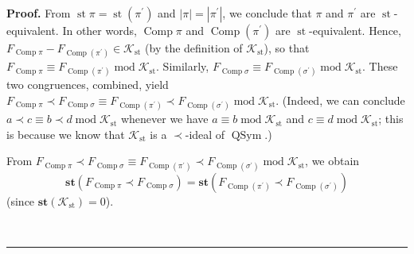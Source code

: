 \documentclass[numbers=enddot,12pt,final,onecolumn,notitlepage]{scrartcl}%
\theoremstyle{definition}
\newenvironment{proof}[1][Proof]{\noindent\textbf{#1.} }{\ \rule{0.5em}{0.5em}}
\newenvironment{verlong}{}{}
\begin{document}
\begin{verlong}
\begin{proof}
From $\operatorname{st} \pi   =\operatorname{st}\left(
\pi^{\prime}\right)  $ and $\left\vert \pi\right\vert =\left\vert \pi^{\prime
}\right\vert $, we conclude that $\pi$ and $\pi^{\prime}$ are
$\operatorname{st}$-equivalent. In other words, $\operatorname*{Comp}\pi$ and
$\operatorname*{Comp}\left(  \pi^{\prime}\right)  $ are $\operatorname{st}%
$-equivalent. Hence, $F_{\operatorname*{Comp}\pi}-F_{\operatorname*{Comp}%
\left(  \pi^{\prime}\right)  }\in\mathcal{K}_{\operatorname{st}}$ (by the
definition of $\mathcal{K}_{\operatorname{st}}$), so that
$F_{\operatorname*{Comp}\pi}\equiv F_{\operatorname*{Comp}\left(  \pi^{\prime
}\right)  }\operatorname{mod}\mathcal{K}_{\operatorname{st}}$. Similarly,
$F_{\operatorname*{Comp}\sigma}\equiv F_{\operatorname*{Comp}\left(
\sigma^{\prime}\right)  }\operatorname{mod}\mathcal{K}_{\operatorname{st}}$.
These two congruences, combined, yield $F_{\operatorname*{Comp}\pi}\left.
\prec\right.  F_{\operatorname*{Comp}\sigma}\equiv F_{\operatorname*{Comp}%
\left(  \pi^{\prime}\right)  }\left.  \prec\right.  F_{\operatorname*{Comp}%
\left(  \sigma^{\prime}\right)  }\operatorname{mod}\mathcal{K}%
_{\operatorname{st}}$. (Indeed, we can conclude $a\left.  \prec\right.
c\equiv b\left.  \prec\right.  d\operatorname{mod}\mathcal{K}%
_{\operatorname{st}}$ whenever we have $a\equiv b\operatorname{mod}%
\mathcal{K}_{\operatorname{st}}$ and $c\equiv d\operatorname{mod}%
\mathcal{K}_{\operatorname{st}}$; this is because we know that $\mathcal{K}%
_{\operatorname{st}}$ is a $\left.  \prec\right.  $-ideal of
$\operatorname*{QSym}$.)

From $F_{\operatorname*{Comp}\pi}\left.  \prec\right.  F_{\operatorname*{Comp}%
\sigma}\equiv F_{\operatorname*{Comp}\left(  \pi^{\prime}\right)  }\left.
\prec\right.  F_{\operatorname*{Comp}\left(  \sigma^{\prime}\right)
}\operatorname{mod}\mathcal{K}_{\operatorname{st}}$, we obtain%
\begin{equation}
\mathbf{st}\left(  F_{\operatorname*{Comp}\pi}\left.  \prec\right.
F_{\operatorname*{Comp}\sigma}\right)  =\mathbf{st}\left(
F_{\operatorname*{Comp}\left(  \pi^{\prime}\right)  }\left.  \prec\right.
F_{\operatorname*{Comp}\left(  \sigma^{\prime}\right)  }\right)
\label{pf.thm.dendri.K.ideal.steq}%
\end{equation}
(since $\mathbf{st}\left(  \mathcal{K}_{\operatorname{st}}\right)  =0$).


\end{proof}
\end{verlong}
\end{document}
